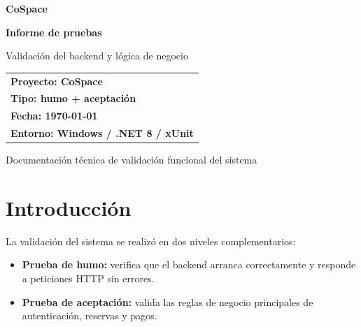 \documentclass[11pt,a4paper]{report}
\begin{document}
\begin{titlepage}
\thispagestyle{empty}

\vspace*{2cm}
\begin{center}
{\color{tealDark}\fontsize{30}{34}\selectfont \textbf{CoSpace}}\par
\vspace{0.7cm}
{\color{teal}\fontsize{24}{30}\selectfont \textbf{Informe de pruebas}}\par
\vspace{1.2cm}
{\color{ink}\Large Validación del backend y lógica de negocio}\par
\vspace{1.5cm}
\begin{tabular}{>{\centering\arraybackslash}p{8cm}}
\rowcolor{mint}
\textbf{Proyecto: CoSpace} \\
\textbf{Tipo: humo + aceptación} \\
\textbf{Fecha: \today} \\
\textbf{Entorno: Windows / .NET 8 / xUnit}
\end{tabular}
\end{center}
\vfill
\begin{center}
\colorbox{teal!10}{\parbox{0.75\textwidth}{\centering\vspace{0.7em}\textcolor{tealDark}{\large Documentación técnica de validación funcional del sistema}\vspace{0.7em}}}
\end{center}
\end{titlepage}

\tableofcontents
\thispagestyle{empty}

\chapter{Introducción}

\noindent La validación del sistema se realizó en dos niveles complementarios:

\begin{itemize}[leftmargin=1.5em,itemsep=0.4em]
    \item \textbf{Prueba de humo:} verifica que el backend arranca correctamente y responde a peticiones HTTP sin errores.
    \item \textbf{Prueba de aceptación:} valida las reglas de negocio principales de autenticación, reservas y pagos.
\end{itemize}
\end{document}
